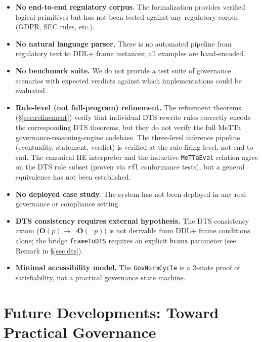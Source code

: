 \documentclass[]{article}
\newcommand{\code}[1]{\texttt{#1}}
\newcommand{\OB}{\ensuremath{\mathbf{O}}}
\newcommand{\DDL}{\textup{DDL+}}
\newcommand{\DTS}{\textup{DTS}}
\begin{document}
\begin{itemize}
\item \textbf{No end-to-end regulatory corpus.}
      The formalization provides verified logical primitives but has not been
      tested against any regulatory corpus (GDPR, SEC rules, etc.).
\item \textbf{No natural language parser.}
      There is no automated pipeline from regulatory text to \DDL{} frame
      instances; all examples are hand-encoded.
\item \textbf{No benchmark suite.}
      We do not provide a test suite of governance scenarios with expected
      verdicts against which implementations could be evaluated.
\item \textbf{Rule-level (not full-program) refinement.}
      The refinement theorems (\S\ref{sec:refinement}) verify that individual
      DTS rewrite rules correctly encode the corresponding \DTS{} theorems,
      but they do not verify the full MeTTa governance-reasoning-engine
      codebase.  The three-level inference pipeline (eventuality, statement,
      verdict) is verified at the rule-firing level, not end-to-end.
      The canonical HE interpreter and the inductive \code{MeTTaEval}
      relation agree on the DTS rule subset (proven via \code{rfl}
      conformance tests), but a general equivalence has not been established.
\item \textbf{No deployed case study.}
      The system has not been deployed in any real governance or compliance
      setting.
\item \textbf{DTS consistency requires external hypothesis.}
      The \DTS{} consistency axiom ($\OB(p) \to \neg\OB(\neg p)$) is not
      derivable from \DDL{} frame conditions alone; the bridge
      \code{frameToDTS} requires an explicit \code{hcons} parameter
      (see Remark in §\ref{sec:dts}).
\item \textbf{Minimal accessibility model.}
      The \code{GovNormCycle} is a 2-state proof of satisfiability, not a
      practical governance state machine.
\end{itemize}

\section{Future Developments: Toward Practical Governance}
\label{sec:future}
\end{document}
